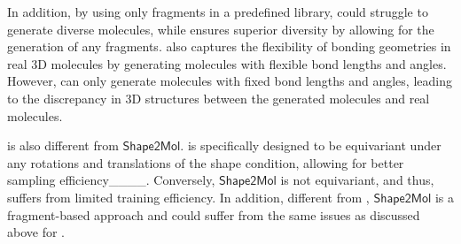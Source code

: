 %
%
%
%
%
%
In addition, by using only fragments in a predefined library, \squid could struggle to generate diverse molecules, 
while \method ensures superior diversity by allowing for the generation of any fragments.
%
%
%
%
\method also captures the flexibility of bonding geometries
in real 3D molecules by generating molecules with flexible bond lengths and angles.
%
However, \squid can only generate molecules with fixed bond lengths and angles, leading to the discrepancy in 3D structures between the %
generated molecules and real molecules. 

\method %
is also different from $\mathsf{Shape2Mol}$. 
%
\method is specifically designed to be equivariant under any rotations and translations of the shape condition, allowing for better sampling efficiency____.
%
Conversely, $\mathsf{Shape2Mol}$ is not equivariant, and thus, suffers from limited training efficiency. %
%
In addition, different from \method, $\mathsf{Shape2Mol}$ is a fragment-based approach and could suffer from the same issues as discussed above for \squid. %
%

